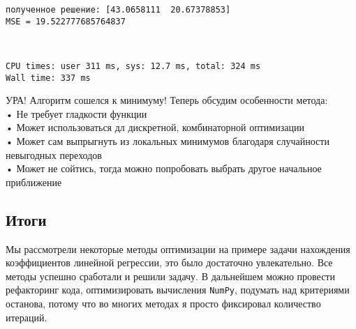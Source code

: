 \documentclass[11pt]{article}
\begin{document}
    \begin{Verbatim}[commandchars=\\\{\}]
полученное решение: [43.0658111  20.67378853]
MSE = 19.522777685764837
    \end{Verbatim}

    \begin{center}
    \end{center}
    { \hspace*{\fill} \\}
    
    \begin{Verbatim}[commandchars=\\\{\}]
CPU times: user 311 ms, sys: 12.7 ms, total: 324 ms
Wall time: 337 ms
    \end{Verbatim}

    УРА! Алгоритм сошелся к минимуму! Теперь обсудим особенности метода:\\
• Не требует гладкости функции\\
• Может использоваться дл дискретной, комбинаторной оптимизации\\
• Может сам выпрыгнуть из локальных минимумов благодаря случайности
невыгодных переходов\\
• Может не сойтись, тогда можно попробовать выбрать другое начальное
приближение

    \hypertarget{ux438ux442ux43eux433ux438}{%
\subsection{Итоги}\label{ux438ux442ux43eux433ux438}}

Мы рассмотрели некоторые методы оптимизации на примере задачи нахождения
коэффициентов линейной регрессии, это было достаточно увлекательно. Все
методы успешно сработали и решили задачу. В дальнейшем можно провести
рефакторинг кода, оптимизировать вычисления \texttt{NumPy}, подумать над
критериями останова, потому что во многих методах я просто фиксировал
количество итераций.


    
    
    
\end{document}
